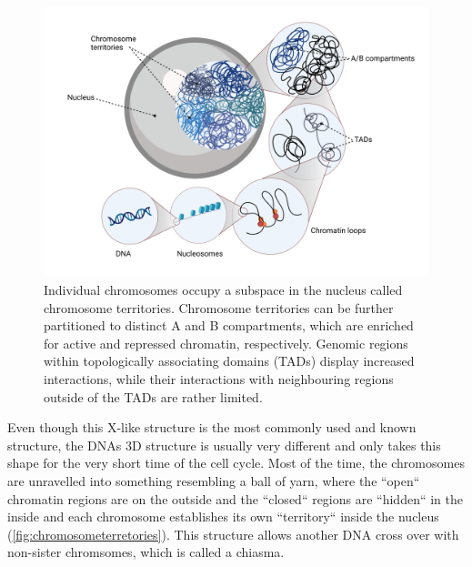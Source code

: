\begin{figure}[!ht]
\centering
\includegraphics[width=0.9\linewidth]{Figures/ChromosomeTerritories}
\caption[Overview DNA structure]{Individual chromosomes occupy a subspace in the nucleus called chromosome territories. Chromosome territories can be further partitioned to distinct A and B compartments, which are enriched for active and repressed chromatin, respectively. Genomic regions within topologically associating domains (TADs) display increased interactions, while their interactions with neighbouring regions outside of the TADs are rather limited.}\label{fig:chromosometerretories}
\end{figure}

Even though this X-like structure is the most commonly used and known structure, the DNAs 3D structure is usually very different and only takes this shape for the very short time of the cell cycle. Most of the time, the chromosomes are unravelled into something resembling a ball of yarn, where the ``open`` chromatin regions are on the outside and the ``closed`` regions are ``hidden`` in the inside and each chromosome establishes its own ``territory`` inside the nucleus (\autoref{fig:chromosometerretories}). This structure allows another DNA cross over with non-sister chromsomes, which is called a chiasma.

